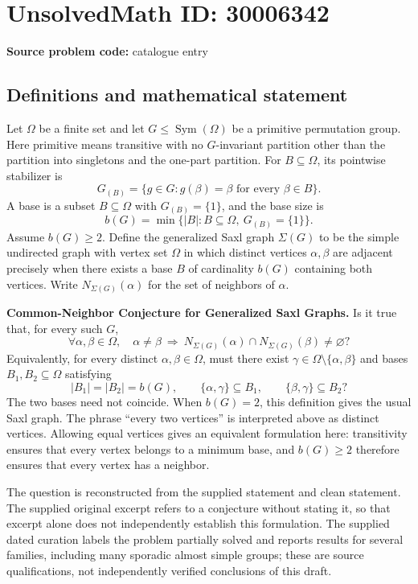 \documentclass[11pt]{article}
\begin{document}
\section*{UnsolvedMath ID: 30006342}
\textbf{Source problem code:} catalogue entry
\subsection{Definitions and mathematical statement}
Let \(\Omega\) be a finite set and let \(G\leq\operatorname{Sym}(\Omega)\) be a primitive permutation group. Here primitive means transitive with no \(G\)-invariant partition other than the partition into singletons and the one-part partition. For \(B\subseteq\Omega\), its pointwise stabilizer is
\[
G_{(B)}=\{g\in G:g(\beta)=\beta\text{ for every }\beta\in B\}.
\]
A base is a subset \(B\subseteq\Omega\) with \(G_{(B)}=\{1\}\), and the base size is
\[
b(G)=\min\{|B|:B\subseteq\Omega,\ G_{(B)}=\{1\}\}.
\]
Assume \(b(G)\geq2\). Define the generalized Saxl graph \(\Sigma(G)\) to be the simple undirected graph with vertex set \(\Omega\) in which distinct vertices \(\alpha,\beta\) are adjacent precisely when there exists a base \(B\) of cardinality \(b(G)\) containing both vertices. Write \(N_{\Sigma(G)}(\alpha)\) for the set of neighbors of \(\alpha\).

\textbf{Common-Neighbor Conjecture for Generalized Saxl Graphs.} Is it true that, for every such \(G\),
\[
\forall\alpha,\beta\in\Omega,\quad
\alpha\neq\beta\ \Longrightarrow\
N_{\Sigma(G)}(\alpha)\cap N_{\Sigma(G)}(\beta)\neq\varnothing?
\]
Equivalently, for every distinct \(\alpha,\beta\in\Omega\), must there exist \(\gamma\in\Omega\setminus\{\alpha,\beta\}\) and bases \(B_1,B_2\subseteq\Omega\) satisfying
\[
|B_1|=|B_2|=b(G),\qquad
\{\alpha,\gamma\}\subseteq B_1,\qquad
\{\beta,\gamma\}\subseteq B_2?
\]
The two bases need not coincide. When \(b(G)=2\), this definition gives the usual Saxl graph. The phrase ``every two vertices'' is interpreted above as distinct vertices. Allowing equal vertices gives an equivalent formulation here: transitivity ensures that every vertex belongs to a minimum base, and \(b(G)\geq2\) therefore ensures that every vertex has a neighbor.

The question is reconstructed from the supplied statement and clean statement. The supplied original excerpt refers to a conjecture without stating it, so that excerpt alone does not independently establish this formulation. The supplied dated curation labels the problem partially solved and reports results for several families, including many sporadic almost simple groups; these are source qualifications, not independently verified conclusions of this draft.
\end{document}
